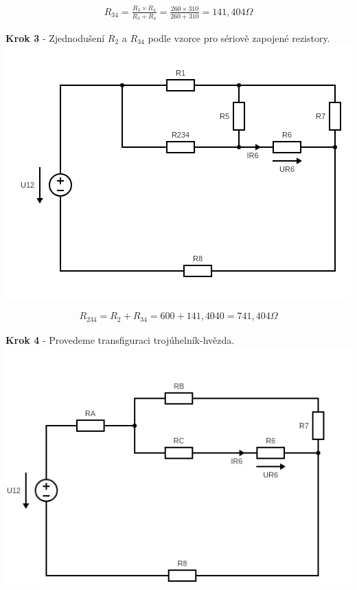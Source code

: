 \begin{gather*}
R_{34} = \frac{R_3 \times R_4}{R_3 + R_4} = \frac{260 \times 310}{260 + 310} = 141,404 \Omega
\end{gather*}

\vspace{1cm}
\begin{center}
\textbf{Krok 3} - Zjednodušení $R_2$ a $R_34$ podle vzorce pro sériově zapojené rezistory.
\includegraphics[scale=0.6,keepaspectratio]{fig/Pr1_steps/Pr1_step03.png} \\
\end{center}
\vspace{-0.3cm}

\begin{gather*}
R_{234} = R_2 + R_34 = 600 + 141,4040 = 741,404 \Omega
\end{gather*}

\newpage

\begin{center}
\textbf{Krok 4} - Provedeme transfiguraci trojúhelník-hvězda.
\includegraphics[scale=0.6,keepaspectratio]{fig/Pr1_steps/Pr1_step04.png} \\
\end{center}
\vspace{-0.3cm}

